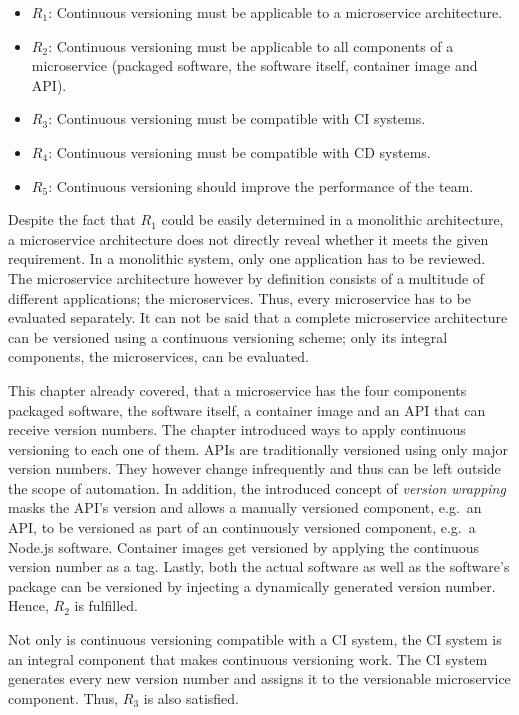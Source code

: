 \begin{itemize}
  \item $R_1$: Continuous versioning must be applicable to a microservice
    architecture.
  \item $R_2$: Continuous versioning must be applicable to all components of a
    microservice (packaged software, the software itself, container image and
    \ac{API}).
  \item $R_3$: Continuous versioning must be compatible with \ac{CI} systems.
  \item $R_4$: Continuous versioning must be compatible with \ac{CD} systems.
  \item $R_5$: Continuous versioning should improve the performance of the team.
\end{itemize}

Despite the fact that $R_1$ could be easily determined in a monolithic
architecture, a microservice architecture does not directly reveal whether it
meets the given requirement. In a monolithic system, only one application has
to be reviewed. The microservice architecture however by definition consists of
a multitude of different applications; the microservices. Thus, every
microservice has to be evaluated separately. It can not be said that a complete
microservice architecture can be versioned using a continuous versioning
scheme; only its integral components, the microservices, can be evaluated.

This chapter already covered, that a microservice has the four components
packaged software, the software itself, a container image and an \ac{API} that
can receive version numbers. The chapter introduced ways to apply continuous
versioning to each one of them. \acp{API} are traditionally versioned using
only major version numbers. They however change infrequently and thus can be
left outside the scope of automation. In addition, the introduced concept of
\textit{version wrapping} masks the \ac{API}'s version and allows a manually
versioned component, e.g.\ an \ac{API}, to be versioned as part of an
continuously versioned component, e.g.\ a Node.js software. Container images
get versioned by applying the continuous version number as a tag. Lastly, both
the actual software as well as the software's package can be versioned by
injecting a dynamically generated version number. Hence, $R_2$ is fulfilled.

Not only is continuous versioning compatible with a \ac{CI} system, the \ac{CI}
system is an integral component that makes continuous versioning work. The
\ac{CI} system generates every new version number and assigns it to the
versionable microservice component. Thus, $R_3$ is also satisfied.

